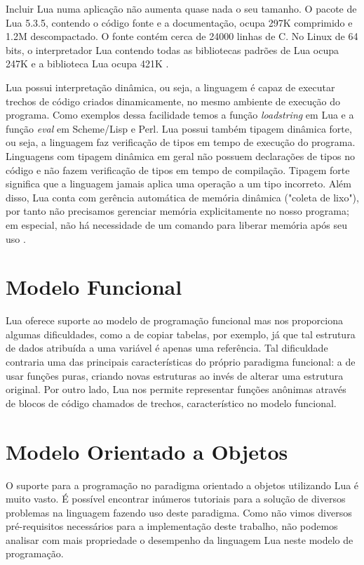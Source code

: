 \documentclass[rel_mlp]{iiufrgs}
\begin{document}
Incluir Lua numa aplicação não aumenta quase nada o seu tamanho. O pacote de Lua 5.3.5, contendo o código fonte e a documentação, ocupa 297K comprimido e 1.2M descompactado. O fonte contém cerca de 24000 linhas de C. No Linux de 64 bits, o interpretador Lua contendo todas as bibliotecas padrões de Lua ocupa 247K e a biblioteca Lua ocupa 421K \cite{AboutLua}.

Lua possui interpretação dinâmica, ou seja, a linguagem é capaz de executar trechos de código criados dinamicamente, no mesmo ambiente de execução do programa. Como exemplos dessa facilidade temos a função \textit{loadstring} em Lua e a função \textit{eval} em Scheme/Lisp e Perl. Lua possui também tipagem dinâmica forte, ou seja, a linguagem faz verificação de tipos em tempo de execução do programa. Linguagens com
tipagem dinâmica em geral não possuem declarações de tipos no código e não fazem verificação de tipos em tempo de compilação. Tipagem forte significa que a linguagem jamais aplica uma operação a um tipo incorreto. Além disso, Lua conta com gerência automática de memória dinâmica ("coleta de lixo"), por tanto não precisamos gerenciar memória explicitamente no nosso programa; em especial, não há necessidade de um comando para liberar memória após seu uso \cite{IntroLuaPDF}.



\section{Modelo Funcional}

Lua oferece suporte ao modelo de programação funcional mas nos proporciona algumas dificuldades, como a de copiar tabelas, por exemplo, já que tal estrutura de dados atribuída a uma variável é apenas uma referência. Tal dificuldade contraria uma das principais características do próprio paradigma funcional: a de usar funções puras, criando novas estruturas ao invés de alterar uma estrutura original. Por outro lado, Lua nos permite representar funções anônimas através de blocos de código chamados de trechos, característico no modelo funcional. \cite{ManualLua}

\section{Modelo Orientado a Objetos}

O suporte para a programação no paradigma orientado a objetos utilizando Lua é muito vasto. É possível encontrar inúmeros tutoriais para a solução de diversos problemas na linguagem fazendo uso deste paradigma. Como não vimos diversos pré-requisitos necessários para a implementação deste trabalho, não podemos analisar com mais propriedade o desempenho da linguagem Lua neste modelo de programação.
\end{document}
